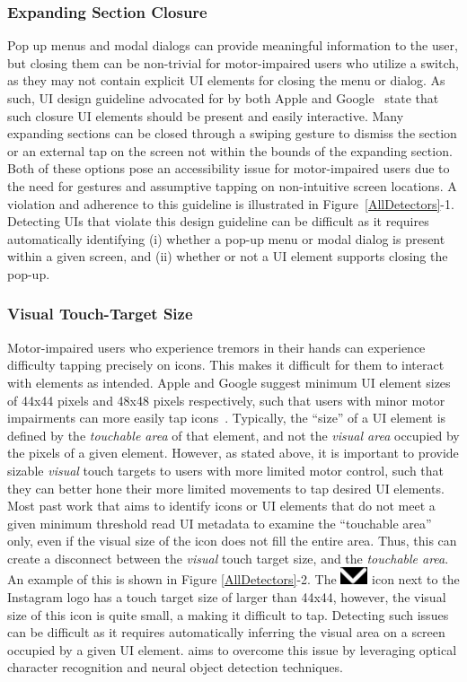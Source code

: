 \subsubsection{Expanding Section Closure}
Pop up menus and modal dialogs can provide meaningful information to the user, but closing them can be non-trivial for motor-impaired users who utilize a switch, as they may not contain explicit UI elements for closing the menu or dialog. As such, UI design guideline advocated for by both Apple and Google~\cite{AppleAccess,GoogleAccess} state that such closure UI elements should be present and easily interactive. Many expanding sections can be closed through a swiping gesture to dismiss the section or an external tap on the screen not within the bounds of the expanding section. Both of these options pose an accessibility issue for motor-impaired users due to the need for gestures and assumptive tapping on non-intuitive screen locations. A violation and adherence to this guideline is illustrated in Figure~\ref{AllDetectors}-1. Detecting UIs that violate this design guideline can be difficult as it requires automatically identifying (i) whether a pop-up menu or modal dialog is present within a given screen, and (ii) whether or not a UI element supports closing the pop-up. 

\subsubsection{Visual Touch-Target Size}
Motor-impaired users who experience tremors in their hands can experience difficulty tapping precisely on icons. This makes it difficult for them to interact with elements as intended. Apple and Google suggest minimum UI element sizes of 44x44 pixels and 48x48 pixels respectively, such that users with minor motor impairments can more easily tap icons~\cite{AppleAccess,GoogleAccess}. 
Typically, the ``size'' of a UI element is defined by the \textit{touchable area} of that element, and not the \textit{visual area} occupied by the pixels of a given element. However, as stated above, it is important to provide sizable \textit{visual} touch targets to users with more limited motor control, such that they can better hone their more limited movements to tap desired UI elements. Most past work that aims to identify icons or UI elements that do not meet a given minimum threshold read UI metadata to examine the ``touchable area'' only, even if the visual size of the icon does not fill the entire area. Thus, this can create a disconnect between the \textit{visual} touch target size, and the \textit{touchable area}. An example of this is shown in Figure \ref{AllDetectors}-2. The \includegraphics[width=0.04\linewidth]{imgs/insta-icon.png} icon next to the Instagram logo has a touch target size of larger than 44x44, however, the visual size of this icon is quite small, a making it difficult to tap. Detecting such issues can be difficult as it requires automatically inferring the visual area on a screen occupied by a given UI element. \MotorEase aims to overcome this issue by leveraging optical character recognition and neural object detection techniques.


